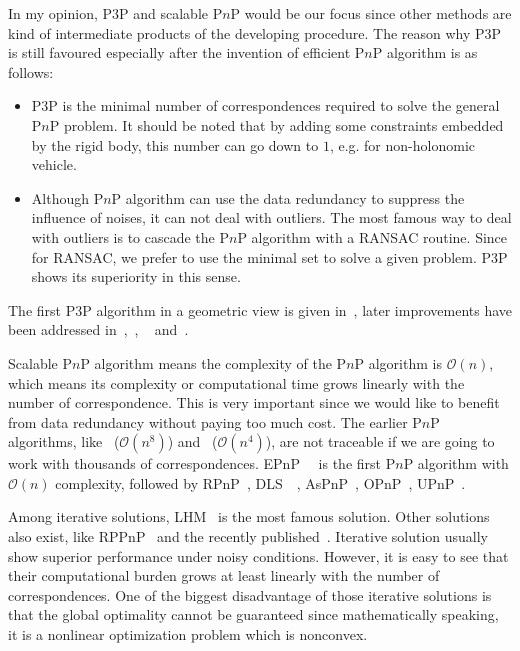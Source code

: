 \documentclass[a4paper]{report}
\begin{document}
In my opinion, P$3$P and scalable P$n$P would be our focus since other methods are kind of intermediate products of the developing procedure. The reason why P$3$P is still favoured especially after the invention of efficient P$n$P algorithm is as follows:
\begin{itemize}
\item P$3$P is the minimal number of correspondences required to solve the general P$n$P problem. It should be noted that by adding some constraints embedded by the rigid body, this number can go down to $1$, e.g. for non-holonomic vehicle.
\item Although P$n$P algorithm can use the data redundancy to suppress the influence of noises, it can not deal with outliers. The most famous way to deal with outliers is to cascade the P$n$P algorithm with a RANSAC routine. Since for RANSAC, we prefer to use the minimal set to solve a given problem. P$3$P shows its superiority in this sense. 
\end{itemize}
The first P$3$P algorithm in a geometric view is given in~\cite{fischler1981random}, later improvements have been addressed in~\cite{pop00011},~\cite{gao2003complete}, ~\cite{li2011stable} and~\cite{kneip2011novel}.

Scalable P$n$P algorithm means the complexity of the P$n$P algorithm is $\mathcal{O}(n)$, which means its complexity or computational time grows linearly with the number of correspondence. This is very important since we would like to benefit from data redundancy without paying too much cost. The earlier P$n$P algorithms, like~\cite{ansar2003linear} ($\mathcal{O}(n^8)$) and~\cite{quan1999linear} ($\mathcal{O}(n^4)$), are not traceable if we are going to work with thousands of correspondences. EPnP~\cite{lepetit2009epnp}~\cite{moreno2007accurate} is the first P$n$P algorithm with $\mathcal{O}(n)$ complexity, followed by RPnP~\cite{li2012robust}, DLS~\cite{hesch2011direct}~\cite{nakano2015globally}, AsPnP~\cite{zheng2013aspnp}, OPnP~\cite{zheng2013revisiting}, UPnP~\cite{kneip2014upnp}.

Among iterative solutions, LHM~\cite{lu2000fast} is the most famous solution. Other solutions also exist, like RPPnP~\cite{garro2012solving} and the recently published~\cite{8470970}. Iterative solution usually show superior performance under noisy conditions. However, it is easy to see that their computational burden grows at least linearly with the number of correspondences. One of the biggest disadvantage of those iterative solutions is that the global optimality cannot be guaranteed since mathematically speaking, it is a nonlinear optimization problem which is nonconvex.
\end{document}
